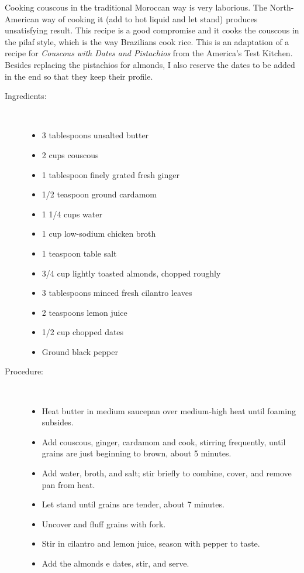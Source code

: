 \documentclass[11pt,letterpaper]{article}
\begin{document}


Cooking couscous in the traditional Moroccan way is very laborious. The North-American way of cooking it (add to hot liquid and let stand) produces unsatisfying result. This recipe is a good compromise and it cooks the couscous in the pilaf style, which is the way Brazilians cook rice.
This is an adaptation of a recipe for {\it Couscous with Dates and Pistachios} from the America's Test Kitchen. Besides replacing the pistachios for almonds, I also reserve the dates to be added in the end so that they keep their profile.

\begin{description}

\item[Ingredients:]\ \\
	\begin{itemize}
	\item 3 tablespoons unsalted butter
	\item 2 cups couscous
	\item 1 tablespoon finely grated fresh ginger
	\item 1/2 teaspoon ground cardamom
	\item 1 1/4 cups water
	\item 1 cup low-sodium chicken broth
	\item 1 teaspoon table salt
	\item 3/4 cup lightly toasted almonds, chopped roughly
	\item 3 tablespoons minced fresh cilantro leaves
	\item 2 teaspoons lemon juice
	\item 1/2 cup chopped dates
	\item Ground black pepper
	\end{itemize}

\item[Procedure:]\ \\
	\begin{itemize}
	\item Heat butter in medium saucepan over medium-high heat until foaming subsides.
	\item Add couscous, ginger, cardamom and cook, stirring frequently, until grains are just beginning to brown, about 5 minutes. 
	\item Add water, broth, and salt; stir briefly to combine, cover, and remove pan from heat. 
	\item Let stand until grains are tender, about 7 minutes. 
	\item Uncover and fluff grains with fork. 
	\item Stir in cilantro and lemon juice, season with pepper to taste.
	\item Add the almonds e dates, stir, and serve.
	\end{itemize}
\end{description}
\end{document}

